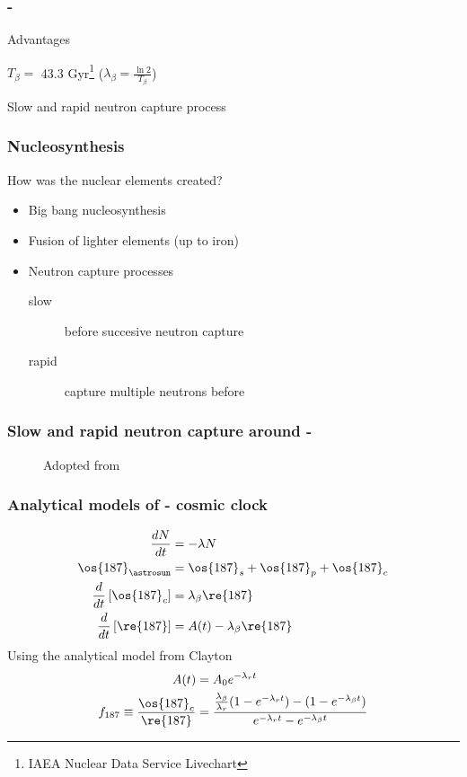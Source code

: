 \begin{frame}
  \frametitle{-}
  \centering
  Advantages
  \begin{description}[labelwidth=\widthof{Different sources}] %
  \item[Halflife] $T_\beta =$ 43.3 Gyr\footnote{IAEA Nuclear Data Service Livechart} ($\lambda_\beta=\frac{\ln 2}{T_\beta}$)
  \item[Different sources] Slow and rapid neutron capture process 
  \end{description} %
\end{frame}

\begin{frame}
  \frametitle{Nucleosynthesis}
  How was the nuclear elements created?
  \begin{itemize}
  \item Big bang nucleosynthesis
  \item Fusion of lighter elements (up to iron)
  \item Neutron capture processes
    \begin{description}
    \item[slow] \betadecays before succesive neutron capture
    \item[rapid] capture multiple neutrons before \betadecay
    \end{description}
  \end{itemize}
\end{frame}

\begin{frame}
  \frametitle{Slow and rapid neutron capture around -}
  \begin{figure}
    
    \caption{Adopted from }
  \end{figure}
\end{frame}

\begin{frame}
  \frametitle{Analytical models of - cosmic clock}
  \begin{align}
    \frac{dN}{dt} &= -\lambda N \\
    \os{187}_{\astrosun} &= \os{187}_{s} + \os{187}_{p} + \os{187}_{c} \\
    \frac{d}{dt}\left[\os{187}_{c}\right] &= \lambda_\beta \re{187} \\
    \frac{d}{dt}\left[\re{187}\right] &= A(t) - \lambda_\beta \re{187} 
  \end{align}
  Using the analytical model from Clayton 
  \begin{align}
    A(t) &= A_0e^{-\lambda_{r}t} \\
    f_{187} \equiv \frac{\os{187}_c}{\re{187}} &= \frac{\frac{\lambda_\beta}{\lambda_r} (1-e^{-\lambda_r t}) - (1-e^{-\lambda_\beta t})}{e^{-\lambda_{r}t}-e^{-\lambda_\beta t}}
  \end{align}
\end{frame}

